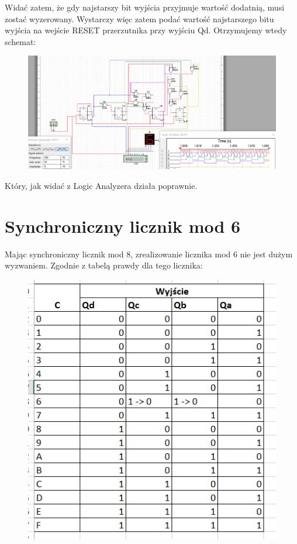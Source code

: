 \documentclass[12pt,a4paper]{article}
\begin{document}
Widać zatem, że gdy najstarszy bit wyjścia przyjmuje wartość dodatnią, musi zostać wyzerowany. Wystarczy więc zatem podać wartość najstarszego bitu wyjścia na wejście RESET przerzutnika przy wyjściu Qd. Otrzymujemy wtedy schemat:

\begin{figure}[H]
\centering
\includegraphics[width=\textwidth]{img/4c_4bit_mod8}
\end{figure} 
Który, jak widać z Logic Analyzera działa poprawnie.
\section{Synchroniczny licznik mod 6}
Mając synchroniczny licznik mod 8, zrealizowanie licznika mod 6 nie jest dużym wyzwaniem. Zgodnie z tabelą prawdy dla tego licznika:

\begin{figure}[H]
\centering
\includegraphics{img/4d_table}
\end{figure}
\end{document}
